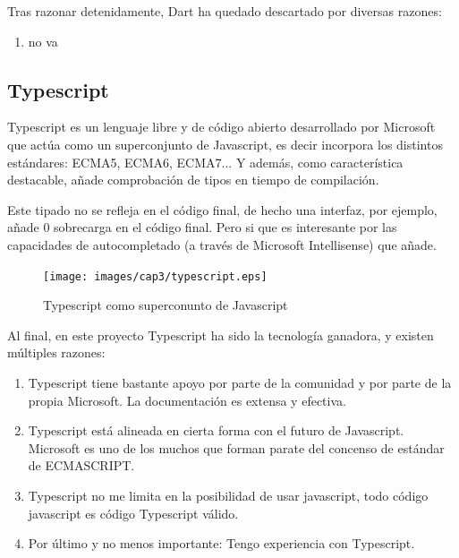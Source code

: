 Tras razonar detenidamente, Dart ha quedado descartado por diversas razones:

\begin{enumerate}
\item no va
\end{enumerate} 

\subsection{Typescript}

Typescript es un lenguaje libre y de código abierto desarrollado por Microsoft que actúa como un superconjunto
de Javascript, es decir incorpora los distintos estándares: ECMA5, ECMA6, ECMA7... Y además, como característica
destacable, añade comprobación de tipos en tiempo de compilación.

\bigskip
Este tipado no se refleja en el código final, de hecho una interfaz, por ejemplo,
añade 0 sobrecarga en el código final. Pero si que es interesante por las capacidades de
autocompletado (a través de Microsoft Intellisense)  que añade.

\begin{figure}[!th]
\begin{center}
\texttt{[image: images/cap3/typescript.eps]}
\caption{Typescript como superconunto de Javascript}
\label{fig:Typescript como superconunto de Javascript}
\end{center}
\end{figure}

\bigskip
Al final, en este proyecto Typescript ha sido la tecnología ganadora, y existen múltiples
razones:

\begin{enumerate}

\item Typescript tiene bastante apoyo por parte de la comunidad y por parte de la propia Microsoft.
La documentación es extensa y efectiva.

\item Typescript está alineada en cierta forma con el futuro de Javascript. Microsoft es uno de los 
muchos que forman parate del concenso de estándar de ECMASCRIPT.

\item Typescript no me limita en la posibilidad de usar javascript, todo código javascript es código
Typescript válido.

\item Por último y no menos importante: Tengo experiencia con Typescript.
\end{enumerate}



